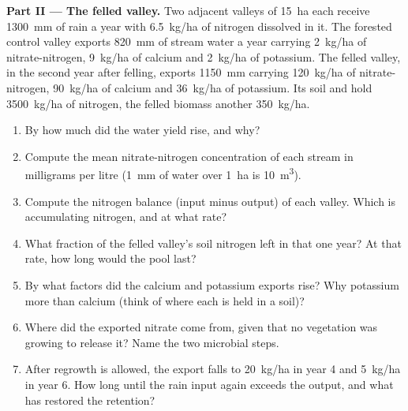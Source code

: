 \begin{problem}
\medskip
\noindent\textbf{Part II --- The felled valley.}
Two adjacent valleys of \qty{15}{ha} each receive \qty{1300}{mm} of
rain a year with \qty{6.5}{kg/ha} of nitrogen dissolved in it. The
forested control valley exports \qty{820}{mm} of stream water a year
carrying \qty{2}{kg/ha} of nitrate-nitrogen, \qty{9}{kg/ha} of calcium
and \qty{2}{kg/ha} of potassium. The felled valley, in the second year
after felling, exports \qty{1150}{mm} carrying \qty{120}{kg/ha} of
nitrate-nitrogen, \qty{90}{kg/ha} of calcium and \qty{36}{kg/ha} of
potassium. Its soil and  hold \qty{3500}{kg/ha} of nitrogen, the
felled biomass another \qty{350}{kg/ha}.
\begin{enumerate}[resume]
  \item By how much did the water yield rise, and why?
  \item Compute the mean nitrate-nitrogen concentration of each stream
        in milligrams per litre (\qty{1}{mm} of water over \qty{1}{ha} is
        \qty{10}{m^3}).
  \item Compute the nitrogen balance (input minus output) of each
        valley. Which is accumulating nitrogen, and at what rate?
  \item What fraction of the felled valley's soil nitrogen left in
        that one year? At that rate, how long would the pool last?
  \item By what factors did the calcium and potassium exports rise?
        Why potassium more than calcium (think of where each is held
        in a soil)?
  \item Where did the exported nitrate come from, given that no
        vegetation was growing to release it? Name the two microbial
        steps.
  \item After regrowth is allowed, the export falls to \qty{20}{kg/ha}
        in year 4 and \qty{5}{kg/ha} in year 6. How long until the
        rain input again exceeds the output, and what has restored the
        retention?
\end{enumerate}


\end{problem}
